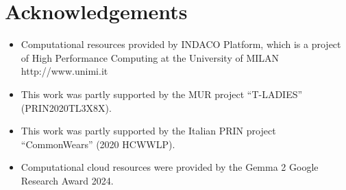 \section*{Acknowledgements}
    
\begin{itemize}
    \item Computational resources provided by INDACO Platform, which is a project of High Performance Computing at the University of MILAN http://www.unimi.it
    \item This work was partly supported by the MUR project ``T-LADIES'' (PRIN2020TL3X8X).
    \item This work was partly supported by the Italian PRIN project ``CommonWears'' (2020 HCWWLP).
    \item Computational cloud resources were provided by the Gemma 2 Google Research Award 2024.
\end{itemize}
